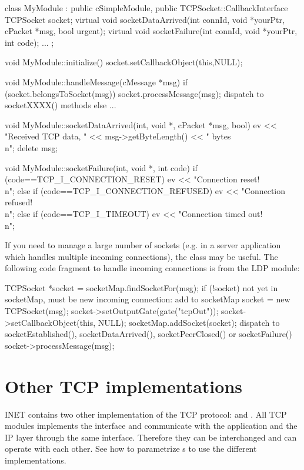 \begin{cpp}
class MyModule : public cSimpleModule, public TCPSocket::CallbackInterface
{
    TCPSocket socket;
    virtual void socketDataArrived(int connId, void *yourPtr,
                                   cPacket *msg, bool urgent);
    virtual void socketFailure(int connId, void *yourPtr, int code);
    ...
};

void MyModule::initialize() {
    socket.setCallbackObject(this,NULL);
}

void MyModule::handleMessage(cMessage *msg) {
    if (socket.belongsToSocket(msg))
        socket.processMessage(msg); dispatch to socketXXXX() methods
    else
        ...
}

void MyModule::socketDataArrived(int, void *, cPacket *msg, bool) {
    ev << "Received TCP data, " << msg->getByteLength() << " bytes\\n";
    delete msg;
}

void MyModule::socketFailure(int, void *, int code) {
    if (code==TCP_I_CONNECTION_RESET)
        ev << "Connection reset!\\n";
    else if (code==TCP_I_CONNECTION_REFUSED)
        ev << "Connection refused!\\n";
    else if (code==TCP_I_TIMEOUT)
        ev << "Connection timed out!\\n";
}
\end{cpp}

If you need to manage a large number of sockets (e.g. in a server
application which handles multiple incoming connections), the
 class may be useful. The following code
fragment to handle incoming connections is from the LDP module:

\begin{cpp}
TCPSocket *socket = socketMap.findSocketFor(msg);
if (!socket)
{
    not yet in socketMap, must be new incoming connection: add to socketMap
    socket = new TCPSocket(msg);
    socket->setOutputGate(gate("tcpOut"));
    socket->setCallbackObject(this, NULL);
    socketMap.addSocket(socket);
}
dispatch to socketEstablished(), socketDataArrived(), socketPeerClosed()
or socketFailure()
socket->processMessage(msg);
\end{cpp}

\section{Other TCP implementations}
\label{sec:other_tcp}

INET contains two other implementation of the TCP protocol:
 and .
All TCP modules implements the  interface and
communicate with the application and the IP layer through the
same interface. Therefore they can be interchanged and can
operate with each other. See 
how to parametrize s to use the different
implementations.

